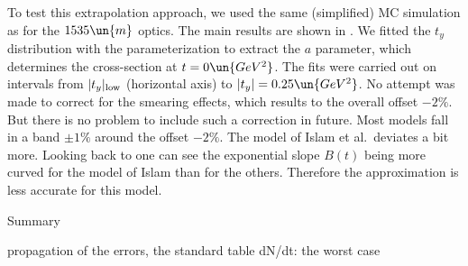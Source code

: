 To test this extrapolation approach, we used the same (simplified) MC simulation as for the $1535\un{m}$ optics. The main results are shown in . We fitted the $t_y$ distribution with the parameterization  to extract the $a$ parameter, which determines the cross-section at $t=0\un{GeV^2}$. The fits were carried out on intervals from $|t_y|_{\rm low}$ (horizontal axis) to $|t_y| = 0.25\un{GeV^2}$. No attempt was made to correct for the smearing effects, which results to the overall offset $-2\percent$. But there is no problem to include such a correction in future. Most models fall in a band $\pm 1\percent$ around the offset $-2\percent$. The model of Islam et al.~deviates a bit more. Looking back to  one can see the exponential slope $B(t)$ being more curved for the model of Islam than for the others. Therefore the approximation  is less accurate for this model.





\caption{Summary}

\> propagation of the errors, the standard table
\> dN/dt: the worst case



